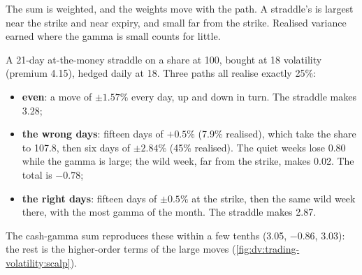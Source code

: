The sum is weighted, and the weights move with the path. A straddle's  is largest near the strike and near expiry, and small far from
the strike. Realised variance earned where the gamma is small counts for little.

\begin{example}\label{ex:dv:trading-volatility:days}
A 21-day at-the-money straddle on a share at 100, bought at 18 volatility (premium 4.15), hedged daily at 18. Three paths all realise exactly
25\%:
\begin{itemize}
\item \textbf{even}: a move of $\pm1.57\%$ every day, up and down in turn. The straddle makes 3.28;
\item \textbf{the wrong days}: fifteen days of $+0.5\%$ (7.9\% realised), which take the share to 107.8, then six days of $\pm2.84\%$ (45\%
realised). The quiet weeks lose 0.80 while the gamma is large; the wild week, far from the strike, makes 0.02. The total is $-0.78$;
\item \textbf{the right days}: fifteen days of $\pm0.5\%$ at the strike, then the same wild week there, with the most gamma of the month. The
straddle makes 2.87.
\end{itemize}
The cash-gamma sum reproduces these within a few tenths (3.05, $-0.86$, 3.03): the rest is the higher-order terms of the large moves
(\cref{fig:dv:trading-volatility:scalp}).
\end{example}

